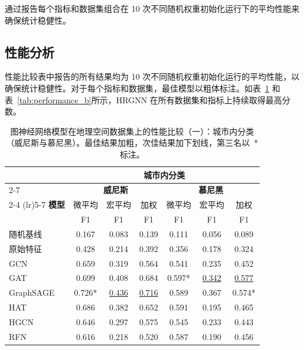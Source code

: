 通过报告每个指标和数据集组合在 10 次不同随机权重初始化运行下的平均性能来确保统计稳健性。

\subsection{性能分析}

性能比较表中报告的所有结果均为 10 次不同随机权重初始化运行的平均性能，以确保统计稳健性。对于每个指标和数据集，最佳模型以粗体标注。如表~\ref{tab:performance_a} 和表~\ref{tab:performance_b}所示，HRGNN 在所有数据集和指标上持续取得最高分数。

\begin{table}[H]
\centering
\caption{图神经网络模型在地理空间数据集上的性能比较（一）：城市内分类（威尼斯与慕尼黑）。最佳结果加粗，次佳结果加下划线，第三名以~* 标注。}
\label{tab:performance_a}
\begin{tabular}{@{}lcccccc@{}}
\toprule
& \multicolumn{6}{c}{\textbf{城市内分类}} \\
\cmidrule(lr){2-7}
& \multicolumn{3}{c}{\textbf{威尼斯}} & \multicolumn{3}{c}{\textbf{慕尼黑}} \\
\cmidrule(lr){2-4} \cmidrule(lr){5-7}
\textbf{模型} & 微平均 & 宏平均 & 加权 & 微平均 & 宏平均 & 加权 \\
& F1 & F1 & F1 & F1 & F1 & F1 \\
\midrule
随机基线 & 0.167 & 0.083 & 0.139 & 0.111 & 0.056 & 0.089 \\
原始特征 & 0.428 & 0.214 & 0.392 & 0.356 & 0.178 & 0.324 \\
\midrule
GCN      & 0.659             & 0.319             & 0.564             & 0.541             & 0.235             & 0.452 \\
GAT      & 0.699             & 0.408             & 0.684             & 0.597*            & \underline{0.342} & \underline{0.577} \\
GraphSAGE & 0.726*           & \underline{0.436} & \underline{0.716} & 0.589             & 0.367             & 0.574* \\
HAT      & 0.686             & 0.382             & 0.652             & 0.591             & 0.195             & 0.465 \\
HGCN     & 0.646             & 0.297             & 0.575             & 0.545             & 0.233             & 0.443 \\
RFN      & 0.616             & 0.218             & 0.520             & 0.587             & 0.190             & 0.456 \\

\end{tabular}
\end{table}
